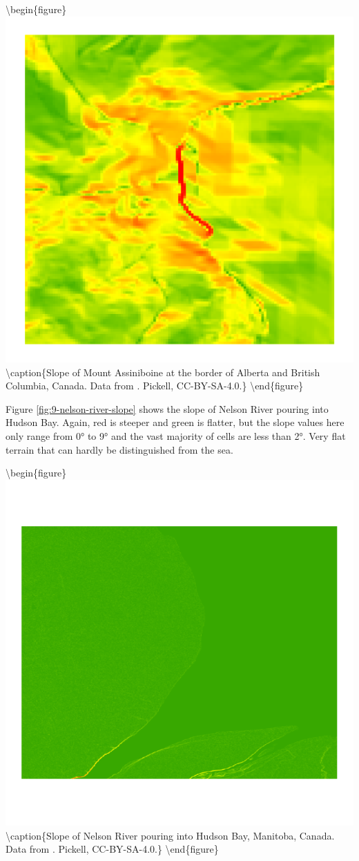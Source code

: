\documentclass[
]{book}
\begin{document}
\textbackslash begin\{figure\}
\includegraphics[width=0.75\linewidth]{images/09-mount-assiniboine-slope} \textbackslash caption\{Slope of Mount Assiniboine at the border of Alberta and British Columbia, Canada. Data from \citet{natural_resources_canada_canadian_2015}. Pickell, CC-BY-SA-4.0.\}\label{fig:9-mount-assiniboine-slope}
\textbackslash end\{figure\}

Figure \ref{fig:9-nelson-river-slope} shows the slope of Nelson River pouring into Hudson Bay. Again, red is steeper and green is flatter, but the slope values here only range from 0° to 9° and the vast majority of cells are less than 2°. Very flat terrain that can hardly be distinguished from the sea.

\textbackslash begin\{figure\}
\includegraphics[width=0.75\linewidth]{images/09-nelson-river-slope} \textbackslash caption\{Slope of Nelson River pouring into Hudson Bay, Manitoba, Canada. Data from \citet{earth_resources_observation_and_science_center_usgs_2018}. Pickell, CC-BY-SA-4.0.\}\label{fig:9-nelson-river-slope}
\textbackslash end\{figure\}
\end{document}
